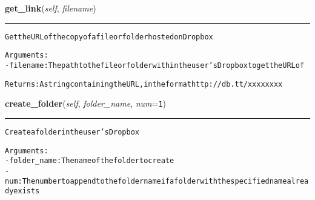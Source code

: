     \vspace{0.5ex}

\hspace{.8\funcindent}\begin{boxedminipage}{\funcwidth}

    \raggedright \textbf{get\_link}(\textit{self}, \textit{filename})

    \vspace{-1.5ex}

    \rule{\textwidth}{0.5\fboxrule}
\setlength{\parskip}{2ex}
\begin{alltt}

Get the URL of the copy of a file or folder hosted on Dropbox

Arguments:
- filename: The path to the file or folder within the user's Dropbox to get the URL of

Returns: A string containing the URL, in the format http://db.tt/xxxxxxxx
\end{alltt}

\setlength{\parskip}{1ex}
    \end{boxedminipage}

    \label{lib:dropbox:Dropbox:create_folder}

    \vspace{0.5ex}

\hspace{.8\funcindent}\begin{boxedminipage}{\funcwidth}

    \raggedright \textbf{create\_folder}(\textit{self}, \textit{folder\_name}, \textit{num}={\tt 1})

    \vspace{-1.5ex}

    \rule{\textwidth}{0.5\fboxrule}
\setlength{\parskip}{2ex}
\begin{alltt}

Create a folder in the user's Dropbox

Arguments:
- folder\_name: The name of the folder to create
- num: The number to append to the folder name if a folder with the specified name already exists
\end{alltt}

\setlength{\parskip}{1ex}
    \end{boxedminipage}



